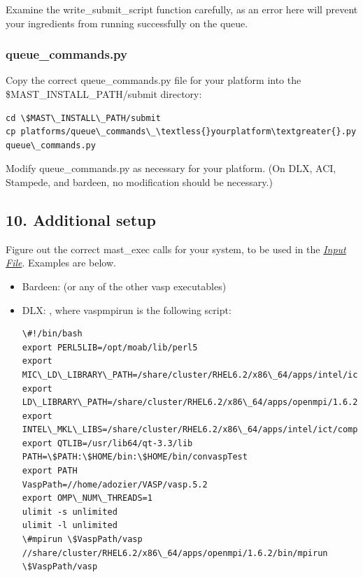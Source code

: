 \documentclass[letterpaper,10pt,english]{sphinxmanual}
\begin{document}
Examine the write\_submit\_script function carefully, as an error here will prevent your ingredients from running successfully on the queue.


\subsubsection{queue\_commands.py}
\label{1_0_installation:queue-commands-py}
Copy the correct queue\_commands.py file for your platform into the \$MAST\_INSTALL\_PATH/submit directory:

\begin{Verbatim}[commandchars=\\\{\}]
cd \$MAST\_INSTALL\_PATH/submit
cp platforms/queue\_commands\_\textless{}yourplatform\textgreater{}.py queue\_commands.py
\end{Verbatim}

Modify queue\_commands.py as necessary for your platform. (On DLX, ACI, Stampede, and bardeen, no modification should be necessary.)


\subsection{10. Additional setup}
\label{1_0_installation:additional-setup}
Figure out the correct mast\_exec calls for your system, to be used in the {\hyperref[3_0_inputfile::doc]{\emph{Input File}}}. Examples are below.
\begin{itemize}
\item {} 
Bardeen:   (or any of the other vasp executables)

\item {} 
DLX: , where vaspmpirun is the following script:

\begin{Verbatim}[commandchars=\\\{\}]
\#!/bin/bash
export PERL5LIB=/opt/moab/lib/perl5
export MIC\_LD\_LIBRARY\_PATH=/share/cluster/RHEL6.2/x86\_64/apps/intel/ict/composer\_xe\_2013.0.079/compiler/lib/mic
export LD\_LIBRARY\_PATH=/share/cluster/RHEL6.2/x86\_64/apps/openmpi/1.6.2/lib:/share/cluster/RHEL6.2/x86\_64/apps/intel/ict/composer\_xe\_2013.0.079/compiler/lib/intel64:/share/cluster/RHEL6.2/x86\_64/apps/intel/ict/composer\_xe\_2013.0.079/mkl/lib/intel64
export INTEL\_MKL\_LIBS=/share/cluster/RHEL6.2/x86\_64/apps/intel/ict/composer\_xe\_2013.0.079/mkl/lib/intel64
export QTLIB=/usr/lib64/qt-3.3/lib
PATH=\$PATH:\$HOME/bin:\$HOME/bin/convaspTest
export PATH
VaspPath=//home/adozier/VASP/vasp.5.2
export OMP\_NUM\_THREADS=1
ulimit -s unlimited
ulimit -l unlimited
\#mpirun \$VaspPath/vasp
//share/cluster/RHEL6.2/x86\_64/apps/openmpi/1.6.2/bin/mpirun \$VaspPath/vasp
\end{Verbatim}

\end{itemize}
\end{document}

